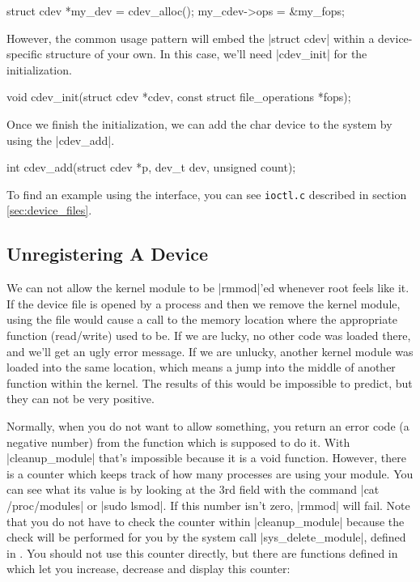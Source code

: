 \documentclass[10pt, oneside]{book}
\begin{document}
\begin{code}
struct cdev *my_dev = cdev_alloc();
my_cdev->ops = &my_fops;
\end{code}

However, the common usage pattern will embed the \cpp|struct cdev| within a device-specific structure of your own.
In this case, we'll need \cpp|cdev_init| for the initialization.

\begin{code}
void cdev_init(struct cdev *cdev, const struct file_operations *fops);
\end{code}

Once we finish the initialization, we can add the char device to the system by using the \cpp|cdev_add|.

\begin{code}
int cdev_add(struct cdev *p, dev_t dev, unsigned count);
\end{code}

To find an example using the interface, you can see \verb|ioctl.c| described in section \ref{sec:device_files}.

\subsection{Unregistering A Device}
\label{sec:unregister_device}
We can not allow the kernel module to be \sh|rmmod|'ed whenever root feels like it.
If the device file is opened by a process and then we remove the kernel module, using the file would cause a call to the memory location where the appropriate function (read/write) used to be.
If we are lucky, no other code was loaded there, and we'll get an ugly error message.
If we are unlucky, another kernel module was loaded into the same location, which means a jump into the middle of another function within the kernel.
The results of this would be impossible to predict, but they can not be very positive.

Normally, when you do not want to allow something, you return an error code (a negative number) from the function which is supposed to do it.
With \cpp|cleanup_module| that's impossible because it is a void function.
However, there is a counter which keeps track of how many processes are using your module.
You can see what its value is by looking at the 3rd field with the command \sh|cat /proc/modules| or \sh|sudo lsmod|.
If this number isn't zero, \sh|rmmod| will fail.
Note that you do not have to check the counter within \cpp|cleanup_module| because the check will be performed for you by the system call \cpp|sys_delete_module|, defined in .
You should not use this counter directly, but there are functions defined in  which let you increase, decrease and display this counter:
\end{document}
